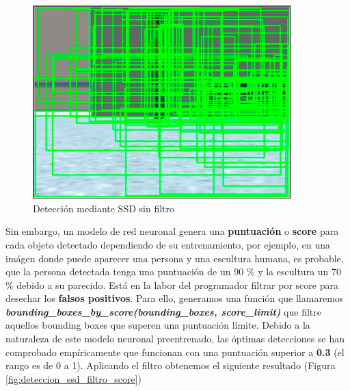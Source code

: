 \begin{figure} [H]
  \begin{center}
    \includegraphics[width=10cm]{imagenes/deteccion-ssd-sin-filtro.png}
  \end{center}
  \caption[Detección mediante SSD sin filtro]{Detección mediante SSD sin filtro}
  \label{fig:deteccion_ssd_sin_filtro}
\end{figure}

Sin embargo, un modelo de red neuronal genera una \textbf{puntuación} o \textbf{score} para cada objeto detectado dependiendo de su entrenamiento, por ejemplo, en una imágen donde puede aparecer una persona y una escultura humana, es probable, que la persona detectada tenga una puntuación de un 90 \% y la escultura un 70 \% debido a su parecido. Está en la labor del programador filtrar por score para desechar los \textbf{falsos positivos}. Para ello, generamos una función que llamaremos \textbf{\textit{bounding\_boxes\_by\_score(bounding\_boxes, score\_limit)}} que filtre aquellos bounding boxes que superen una puntuación límite. Debido a la naturaleza de este modelo neuronal preentrenado, las óptimas detecciones se han comprobado empíricamente que funcionan con una puntuación superior a \textbf{0.3} (el rango es de 0 a 1). Aplicando el filtro obtenemos el siguiente resultado (Figura \ref{fig:deteccion_ssd_filtro_score})\\

